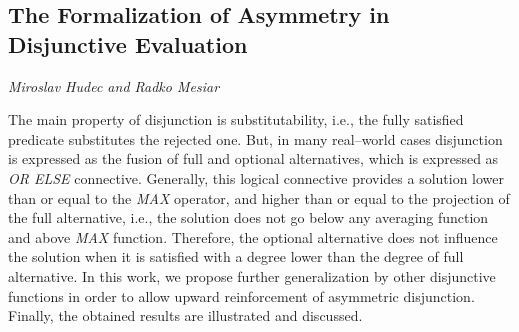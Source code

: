 \documentclass[../booklet.tex]{subfiles}
\begin{document}
\subsection[The Formalization of Asymmetry in Disjunctive Evaluation. {\it Miroslav Hudec and Radko Mesiar}]{The Formalization of Asymmetry in Disjunctive Evaluation}
 

\begin{center}
  {\it Miroslav Hudec and Radko Mesiar}
\end{center}



The main property of disjunction is substitutability, i.e., the fully satisfied predicate substitutes the rejected one. But, in many real--world cases disjunction is expressed as the fusion of full and optional alternatives, which is expressed as \textit{OR ELSE} connective. 
Generally, this logical connective provides a solution lower than or equal to the \textit{MAX} operator, and higher than or equal to the projection of the full alternative, i.e., the solution does not go below any averaging function and above \textit{MAX} function. Therefore, the optional alternative does not influence the solution when it is satisfied with a degree lower than the degree of full alternative. In this work, we propose further generalization by other disjunctive functions in order to allow upward reinforcement of asymmetric disjunction. Finally, the obtained results are illustrated and discussed.

\end{document}
